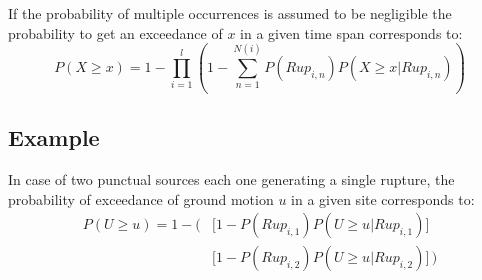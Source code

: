 If the probability of multiple occurrences is assumed to be negligible the 
probability to get an exceedance of $x$ in a given time span corresponds to:
%
\begin{equation}
P(X\geq x)=1-\prod\limits_{i=1}^{l} 
	\left( 
		1-\sum\limits_{n=1}^{N(i)}P(Rup_{i,n})P(X\geq x|Rup_{i,n})
	\right)
\end{equation}

\subsection{Example}
In case of two punctual sources each one generating a single rupture, the 
probability of exceedance of ground motion $u$ in a given site corresponds to:
%
\begin{eqnarray}
P(U\geq u)=
	1-
	\biggl(& 
		\bigl[ 1-P(Rup_{i,1})P(U\geq u|Rup_{i,1}) \bigr] \nonumber \\
		& \bigl[ 1-P(Rup_{i,2})P(U\geq u|Rup_{i,2}) \bigr]
	\,\biggr)
\end{eqnarray}